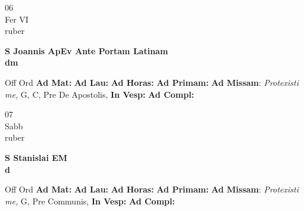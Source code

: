 \documentclass[10pt, openany]{book}
\begin{document}
    \begin{center}
        \begin{minipage}{3.5in}
            \vspace{2em}
            \begin{minipage}{0.5in}
                {\Huge 06} \\
                {\normalsize Fer VI} \\
                {\normalsize ruber}
            \end{minipage}
            \begin{minipage}{3.0in}
                \textbf{ \large S Joannis ApEv Ante Portam Latinam \\
                \textnormal{\normalsize dm}} \\ 
            \end{minipage}
            \begin{justify}Off Ord
                \textbf{Ad Mat: }
                \textbf{Ad Lau: }
                \textbf{Ad Horas: }
                \textbf{Ad Primam: }\textbf{Ad Missam}: \textit{Protexisti me,} G, C, Pre De Apostolis,  
                \textbf{In Vesp: }
                \textbf{Ad Compl: }
            \end{justify}
        \end{minipage}
    \end{center}

    \begin{center}
        \begin{minipage}{3.5in}
            \vspace{2em}
            \begin{minipage}{0.5in}
                {\Huge 07} \\
                {\normalsize Sabb} \\
                {\normalsize ruber}
            \end{minipage}
            \begin{minipage}{3.0in}
                \textbf{ \large S Stanislai EM \\
                \textnormal{\normalsize d}} \\ 
            \end{minipage}
            \begin{justify}Off Ord
                \textbf{Ad Mat: }
                \textbf{Ad Lau: }
                \textbf{Ad Horas: }
                \textbf{Ad Primam: }\textbf{Ad Missam}: \textit{Protexisti me,} G, Pre Communis,  
                \textbf{In Vesp: }
                \textbf{Ad Compl: }
            \end{justify}
        \end{minipage}
    \end{center}
\end{document}
